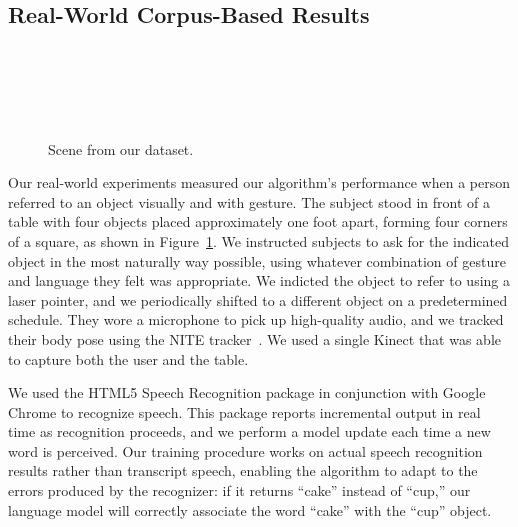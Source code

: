 \documentclass[letterpaper, 10 pt, conference]{ieeeconf}
\begin{document}
\subsection{Real-World Corpus-Based Results}

\begin{figure}
\parbox{1\linewidth}{~\\~\\~\\~\\}
\caption{Scene from our dataset.\label{fig:corpus_scene}}
\end{figure}

Our real-world experiments measured our algorithm's performance when a
person referred to an object visually and with gesture.  The subject stood in front of a table with four objects placed approximately one foot apart, forming four corners of a square,
as shown in Figure~\ref{fig:corpus_scene}.  We instructed subjects to ask for the indicated object in the most naturally way possible, using whatever combination of gesture and language they felt was appropriate. We indicted the object to refer to using a
laser pointer, and we periodically shifted to a different object on a
predetermined schedule.  They wore a microphone to pick up
high-quality audio, and we tracked their body pose using the NITE
tracker~\citep{openni}.  We used a single Kinect that was able to capture both the user and the table.

We used the HTML5 Speech Recognition package in conjunction with Google Chrome to recognize speech.
This package reports incremental output in real time as recognition
proceeds, and we perform a model update each time a new word is
perceived.  Our training procedure works on actual speech recognition
results rather than transcript speech, enabling the algorithm to adapt
to the errors produced by the recognizer: if it returns ``cake''
instead of ``cup,'' our language model will correctly associate the
word ``cake'' with the ``cup'' object.
\end{document}
